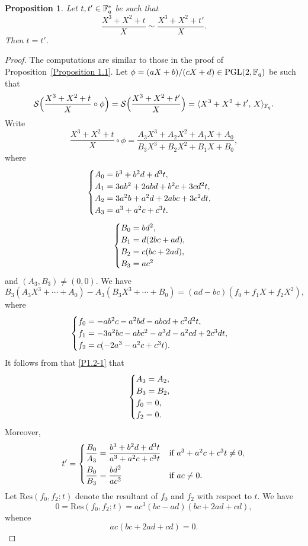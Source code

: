 \documentclass{amsart}
\newtheorem{prop}[thm]{Proposition}
\numberwithin{equation}{section}
\theoremstyle{definition}
\newcommand{\f}{\Bbb F}
\newcommand{\pgl}{\mathrm{PGL}}
\newcommand{\res}{\mathrm{Res}}
\begin{document}
\begin{prop}\label{Proposition 1.2}
Let $t,t'\in\f_q^*$ be such that 
\[
\frac{X^3+X^2+t}X\sim\frac{X^3+X^2+t'}X.
\]
Then $t=t'$.
\end{prop}

\begin{proof}
The computations are similar to those in the proof of Proposition~\ref{Proposition 1.1}. Let $\phi=(aX+b)/(cX+d)\in\pgl(2,\f_q)$ be such that
\begin{equation}\label{P1.2-1}
\mathcal S\Bigl(\frac{X^3+X^2+t}X\circ\phi\Bigr)=\mathcal S\Bigl(\frac{X^3+X^2+t'}X\Bigr)=\langle X^3+X^2+t',\,X\rangle_{\f_q}.
\end{equation}
Write
\[
\frac{X^3+X^2+t}X\circ\phi=\frac{A_3X^3+A_2X^2+A_1X+A_0}{B_3X^3+B_2X^2+B_1X+B_0},
\]
where
\begin{equation}\label{A}
\begin{cases}
A_0=b^3+b^2 d+d^3 t,\cr
A_1=3 a b^2+2 a b d+b^2 c+3 c d^2 t,\cr
A_2=3 a^2 b+a^2 d+2 a b c+3c^2 d t,\cr
A_3=a^3+a^2 c+c^3 t.
\end{cases}
\end{equation}
\begin{equation}\label{B}
\begin{cases}
B_0=b d^2,\cr
B_1=d (2 b c+ad),\cr
B_2=c (bc+2 a d),\cr
B_3=a c^2
\end{cases}
\end{equation}
and $(A_3,B_3)\ne (0,0)$. 
We have 
\[
B_3(A_3X^3+\cdots+A_0)-A_3(B_3X^3+\cdots+B_0)=(ad-bc)(f_0+f_1X+f_2X^2),
\]
where
\begin{equation}\label{f0-2}
\begin{cases}
f_0=-a b^2 c-a^2 b d-a b c d+c^2 d^2 t,\cr
f_1=-3 a^2 b c-a b c^2-a^3 d-a^2 c d+2 c^3 d t,\cr
f_2=c (-2 a^3-a^2 c+c^3 t).
\end{cases}
\end{equation}
It follows from that \eqref{P1.2-1} that
\[
\begin{cases}
A_3=A_2,\cr
B_3=B_2,\cr
f_0=0,\cr
f_2=0.
\end{cases}
\]
Moreover,
\begin{equation}\label{t'}
t'=\begin{cases}
\displaystyle\frac{B_0}{A_3}=\frac{b^3+b^2d+d^3t}{a^3+a^2c+c^3t}&\text{if}\ a^3+a^2c+c^3t\ne 0,\vspace{0.4em}\cr
\displaystyle\frac{B_0}{B_3}=\frac{bd^2}{ac^2}&\text{if}\ ac\ne 0.
\end{cases}
\end{equation}
Let $\res(f_0,f_2;t)$ denote the resultant of $f_0$ and $f_2$ with respect to $t$. We have 
\[
0=\res(f_0,f_2;t)=ac^3(bc-ad)(bc+2ad+cd),
\]
whence
\begin{equation}\label{res}
ac(bc+2ad+cd)=0.
\end{equation}


\end{proof}
\end{document}
